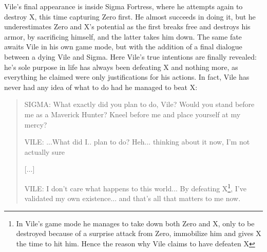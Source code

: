 Vile's final appearance is inside Sigma Fortress, where he attempts again to destroy X, this time capturing Zero first. He almost succeeds in doing it, but he underestimates Zero and X's potential as the first breaks free and destroys his armor, by sacrificing himself, and the latter takes him down. The same fate awaits Vile in his own game mode, but with the addition of a final dialogue between a dying Vile and Sigma. Here Vile's true intentions are finally revealed: he's sole purpose in life has always been defeating X and nothing more, as everything he claimed were only justifications for his actions. In fact, Vile has never had any idea of what to do had he managed to beat X:
\begin{quote}
	SIGMA: What exactly did you plan to do, Vile? Would you stand before me as a Maverick Hunter? Kneel before me and place yourself at my mercy?
	
	VILE: ...What did I.. plan to do? Heh... thinking about it now, I'm not actually sure
	
	[$\dots$]
	
	VILE: I don't care what happens to this world... By defeating X\footnote{In Vile's game mode he manages to take down both Zero and X, only to be destroyed because of a surprise attack from Zero, immobilize him and gives X the time to hit him. Hence the reason why Vile claims to have defeaten X}, I've validated
	my own existence... and that's all that matters to me now.
\end{quote}



